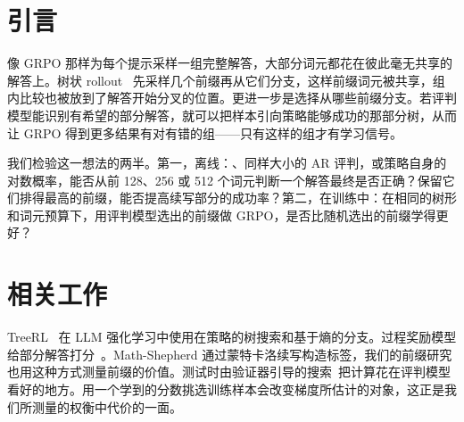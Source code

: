 
\section{引言}\label{sec:intro}

像 GRPO 那样为每个提示采样一组完整解答，大部分词元都花在彼此毫无共享的解答上。树状 rollout~\cite{hou2025treerl} 先采样几个前缀再从它们分支，这样前缀词元被共享，组内比较也被放到了解答开始分叉的位置。更进一步是选择从哪些前缀分支。若评判模型能识别有希望的部分解答，就可以把样本引向策略能够成功的那部分树，从而让 GRPO 得到更多结果有对有错的组——只有这样的组才有学习信号。

我们检验这一想法的两半。第一，离线：\kev{}、同样大小的 AR 评判，或策略自身的对数概率，能否从前 128、256 或 512 个词元判断一个解答最终是否正确？保留它们排得最高的前缀，能否提高续写部分的成功率？第二，在训练中：在相同的树形和词元预算下，用评判模型选出的前缀做 GRPO，是否比随机选出的前缀学得更好？

\section{相关工作}\label{sec:related}

TreeRL~\cite{hou2025treerl} 在 LLM 强化学习中使用在策略的树搜索和基于熵的分支。过程奖励模型给部分解答打分~\cite{lightman2024verify,wang2024mathshepherd}。Math-Shepherd 通过蒙特卡洛续写构造标签，我们的前缀研究也用这种方式测量前缀的价值。测试时由验证器引导的搜索~\cite{snell2025scaling}把计算花在评判模型看好的地方。用一个学到的分数挑选训练样本会改变梯度所估计的对象，这正是我们所测量的权衡中代价的一面。
